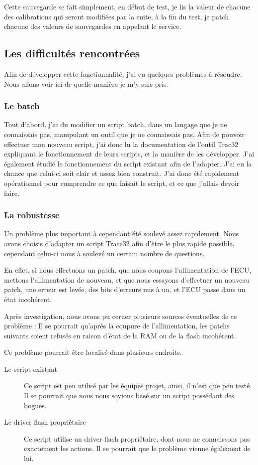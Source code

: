	Cette sauvegarde se fait simplement, en début de test, je lis la valeur de chacune des calibrations qui seront modifiées par la suite, à la fin du test, je patch chacune des valeurs de sauvegardes en appelant le service.
	
	\subsection{Les difficultés rencontrées}
	Afin de développer cette fonctionnalité, j'ai eu quelques problèmes à résoudre. Nous allons voir ici de quelle manière je m'y suis pris.
	\subsubsection{Le batch}
	Tout d'abord, j'ai du modifier un script batch, dans un langage que je ne connaissais pas, manipulant un outil que je ne connaissais pas. Afin de pouvoir effectuer mon nouveau script, j'ai donc lu la documentation de l'outil Trac32 expliquant le fonctionnement de leurs scripts, et la manière de les développer. J'ai également étudié le fonctionnement du script existant afin de l'adapter. J'ai eu la chance que celui-ci soit clair et assez bien construit. J'ai donc été rapidement opérationnel pour comprendre ce que faisait le script, et ce que j'allais devoir faire.
	
	\subsubsection{La robustesse}
Un problème plus important à cependant été soulevé assez rapidement. Nous avons choisis d'adapter un script Trace32 afin d'être le plus rapide possible, cependant celui-ci nous à soulevé un certain nombre de questions.

En effet, si nous effectuons un patch, que nous coupons l'allimentation de l'ECU, mettons l'allimentation de nouveau, et que nous essayons d'effectuer un nouveau patch, une erreur est levée, des bits d'erreurs mis à un, et l'ECU passe dans un état incohérent. 

Après investigation, nous avons pu cerner plusieurs sources éventuelles de ce problème : 
Il se pourrait qu'après la coupure de l'allimentation, les patchs suivants soient refusés en raison d'état de la RAM ou de la flash incohérent. 

Ce problème pourrait être localisé dans plusieurs endroits.
\begin{description}
\item[Le script existant] Ce script est peu utilisé par les équipes projet, ainsi, il n'est que peu testé. Il se pourrait que nous nous soyions basé sur un script possédant des bogues.
\item[Le driver flash propriétaire] Ce script utilise un driver flash propriétaire, dont nous ne connaissons pas exactement les actions. Il se pourrait que le problème vienne également de lui.
\end{description}

